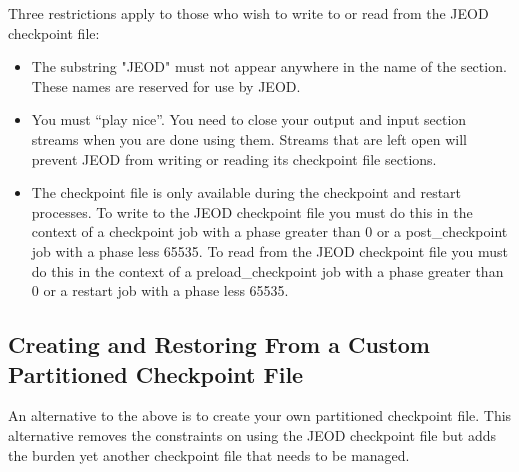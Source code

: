 Three restrictions apply to those who wish to write to or read from
the JEOD checkpoint file:
\begin{itemize}
\item The substring "JEOD" must not appear anywhere in the name of the section.
These names are reserved for use by JEOD.
\item You must ``play nice''. You need to close your output and input section
streams when you are done using them. Streams that are left open will prevent
JEOD from writing or reading its checkpoint file sections.
\item The checkpoint file is only available during the checkpoint and restart
processes.
To write to the JEOD checkpoint file you must do this in the context
of a checkpoint job with a phase greater than 0 or a
post\_checkpoint job with a phase less 65535.
To read from the JEOD checkpoint file you must do this in the context
of a preload\_checkpoint job with a phase greater than 0 or a
restart job with a phase less 65535.
\end{itemize}

\subsection{Creating and Restoring From a Custom Partitioned Checkpoint File}
An alternative to the above is to create your own partitioned checkpoint file.
This alternative removes the constraints on using the JEOD checkpoint file
but adds the burden yet another checkpoint file that needs to
be managed.

